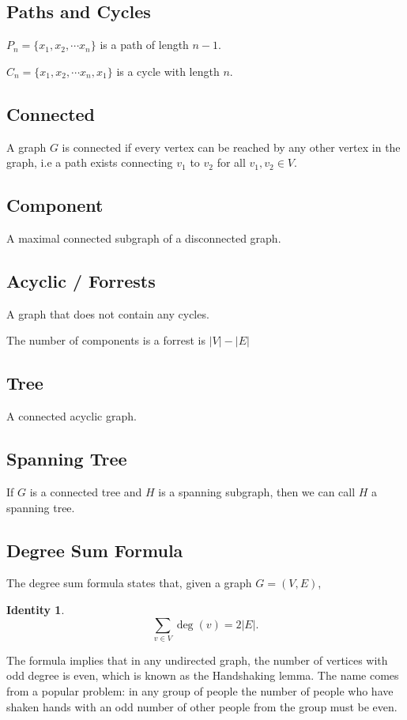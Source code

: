 \documentclass{article}
\newtheorem{identity}[theorem]{Identity}
\begin{document}
\subsection{Paths and Cycles}
$P_n = \{ x_1, x_2, \cdots x_n \}$ is a path of length $n-1$.

$C_n = \{ x_1, x_2, \cdots x_n, x_1 \}$ is a cycle with length $n$.

\subsection{Connected}
A graph $G$ is connected if every vertex can be reached by any other vertex in the graph, i.e a path exists connecting $v_1$ to $v_2$ for all $v_1,v_2 \in V$.

\subsection{Component}
A maximal connected subgraph of a disconnected graph.

\subsection{Acyclic / Forrests}
A graph that does not contain any cycles.

The number of components is a forrest is $|V| - |E|$

\subsection{Tree}
A connected acyclic graph.

\subsection{Spanning Tree}
If $G$ is a connected tree and $H$ is a spanning subgraph, then we can call $H$ a spanning tree.

\subsection{Degree Sum Formula}
The degree sum formula states that, given a graph $G=(V,E)$,
\begin{identity}
\[
\sum _{v\in V}\deg(v)=2|E|.
\]
\end{identity}

The formula implies that in any undirected graph, the number of vertices with odd degree is even, which is known as the Handshaking lemma. The name comes from a popular problem: in any group of people the number of people who have shaken hands with an odd number of other people from the group must be even.
\end{document}
